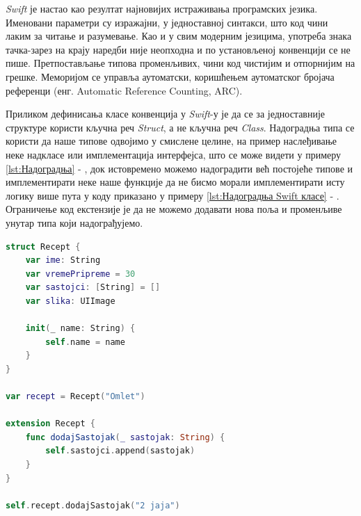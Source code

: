 \documentclass[12pt,oneside]{memoir}
\begin{document}
\indent \textit{Swift} је настао као резултат најновијих истраживања програмских језика.
Именовани параметри су изражајни, у једноставној синтакси, што код чини лаким за читање и разумевање. Као и у свим модерним језицима, употреба знака тачка-зарез на крају наредби није неопходна и по установљеној конвенцији се не пише. Претпостављање типова променљивих, чини код чистијим и отпорнијим на грешке. Меморијом се управља аутоматски, коришћењем аутоматског бројача референци (енг. Automatic Reference Counting, ARC). %




\indent Приликом дефинисања класе конвенција у \textit{Swift}-у је да се за једноставније структуре користи кључна реч \textit{Struct}, а не кључна реч \textit{Class}. Надоградња типа се користи да наше типове одвојимо у смислене целине, на пример наслеђивање неке надкласе или имплементација интерфејса, што се може видети у примеру \ref{lst:Надоградња} - , док истовремено можемо надоградити већ постојеће типове и имплементирати неке наше функције да не бисмо морали имплементирати исту логику више пута у коду приказано у примеру \ref{lst:Надоградња Swift класе} - . Ограничење код екстензије је да не можемо додавати нова поља и променљиве унутар типа који надограђујемо.

\begin{lstlisting}[caption=\textit{{Надоградња постојећег типа (класе, структуре)}}, label={lst:Надоградња}, language=Swift, frame=single]
struct Recept {
    var ime: String
    var vremePripreme = 30
    var sastojci: [String] = []
    var slika: UIImage

    init(_ name: String) {
        self.name = name
    }
}

var recept = Recept("Omlet")

extension Recept {
    func dodajSastojak(_ sastojak: String) {
        self.sastojci.append(sastojak)
    }
}

self.recept.dodajSastojak("2 jaja")

\end{lstlisting}
\end{document}

